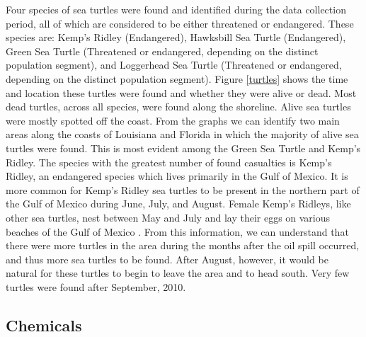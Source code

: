 \documentclass[authoryear,12pt]{elsarticle}
\begin{document}
Four species of sea turtles were found and identified during the data collection period, all of which are considered to be either threatened or endangered. These species are: Kemp's Ridley (Endangered), Hawksbill Sea Turtle (Endangered), Green Sea Turtle (Threatened or endangered, depending on the distinct population segment), and Loggerhead Sea Turtle (Threatened or endangered, depending on the distinct population segment). Figure \ref{turtles} shows the  {time and location} these turtles were found and whether they were {alive} or dead. Most dead turtles,  {across} all species, were found along the shoreline. Alive sea turtles were mostly spotted off the coast.  {From the graphs we can identify} two main areas along the coasts of Louisiana and Florida in which the  {majority} of  {a}live sea turtles were found.  This is most evident among the Green Sea Turtle and Kemp's Ridley. The species with the greatest number of found casualties  {is} Kemp's Ridley, an endangered species which lives primarily in the Gulf of Mexico.  It is more common for Kemp's Ridley sea turtles to be present in the northern part of the Gulf of Mexico during June, July, and August. Female Kemp's Ridleys, like other sea turtles, nest between May and July and lay their eggs on various beaches of the Gulf of Mexico  \citep{turtles}. From this information, we can understand that there were more turtles in the area during the months after the oil spill occurred, and thus more sea turtles to be found.  After August, however, it would be natural for these turtles to begin to leave the area and  {to} head south. Very few turtles were found after September, 2010.

\subsection{Chemicals}
\end{document}
